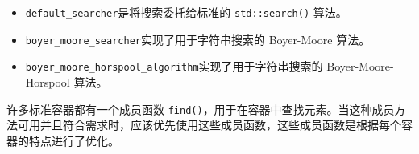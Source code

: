 \begin{itemize}
\item
\verb|default_searcher|是将搜索委托给标准的 \verb|std::search()| 算法。

\item
\verb|boyer_moore_searcher|实现了用于字符串搜索的 Boyer-Moore 算法。
\item
\verb|boyer_moore_horspool_algorithm|实现了用于字符串搜索的 Boyer-Moore-Horspool 算法。
\end{itemize}

许多标准容器都有一个成员函数 \verb|find()|，用于在容器中查找元素。当这种成员方法可用并且符合需求时，应该优先使用这些成员函数，这些成员函数是根据每个容器的特点进行了优化。
